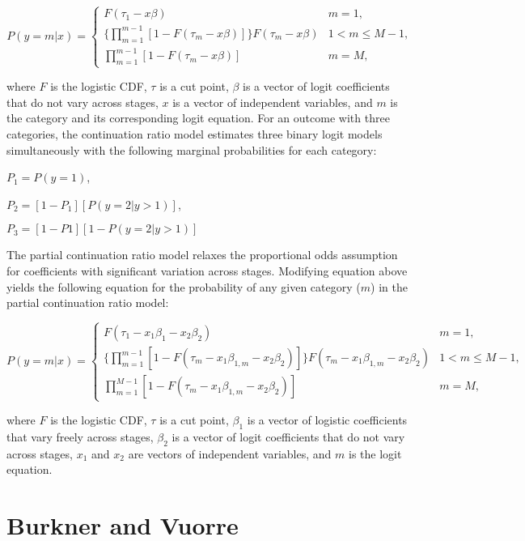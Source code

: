 \begin{equation*}
P(y = m | x) =
\begin{cases}
F(\tau_{1} - x\beta) & m=1,\\
\{ \prod_{m=1}^{m-1} [1-F(\tau_{m} - x\beta)] \} F(\tau_{m} - x\beta) & 1 < m \leq M - 1, \\
\prod_{m=1}^{m-1} [1-F(\tau_{m} - x\beta)] & m=M,
\end{cases}
\end{equation*}

where $F$ is the logistic CDF, $\tau$ is a cut point, $\beta$ is a vector of logit coefficients that do not vary across stages, $x$ is a vector of independent variables, and $m$ is the category and its corresponding logit equation. For an outcome with three categories, the continuation ratio model estimates three binary logit models simultaneously with the following marginal probabilities for each category:

$P_{1} = P(y=1)$,

$P_{2} = [1-P_{1}][P(y=2 | y>1)]$,

$P_{3} = [1-P{1}][1-P(y=2|y>1)]$

The partial continuation ratio model relaxes the proportional odds assumption for coefficients with significant variation across stages. Modifying equation above yields the following equation for the probability of any given category ($m$) in the partial continuation ratio model:


\begin{equation*}
P(y = m | x) =
\begin{cases}
F(\tau_{1} - x_{1}\beta_{1} - x_{2}\beta_{2}) & m=1,\\
\{ \prod_{m=1}^{m-1} [1-F(\tau_{m} - x_{1}\beta_{1,m} - x_{2}\beta_{2})] \} F(\tau_{m} - x_{1}\beta_{1,m} - x_{2}\beta_{2}) & 1 < m \leq M - 1, \\
\prod_{m=1}^{M-1} [1-F(\tau_{m} - x_{1}\beta_{1,m} - x_{2}\beta_{2})] & m=M,
\end{cases}
\end{equation*}

where $F$ is the logistic CDF, $\tau$ is a cut point, $\beta_{1}$ is a vector of logistic coefficients that vary freely across stages, $\beta_{2}$ is a vector of logit coefficients that do not vary across stages, $x_{1}$ and $x_{2}$ are vectors of independent variables, and $m$ is the logit equation.


\section{Burkner and Vuorre}

